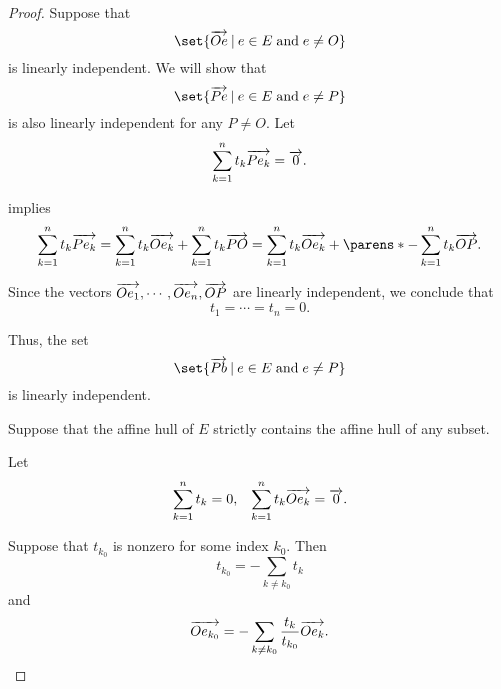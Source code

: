 \begin{proof}
   Suppose that
  \begin{equation*}
    \set{ \vect{O e} \given e \in E \T{and} e \neq O }
  \end{equation*}
  is linearly independent. We will show that
  \begin{equation*}
    \set{ \vect{P e} \given e \in E \T{and} e \neq P }
  \end{equation*}
  is also linearly independent for any \( P \neq O \). Let
  \begin{equation*}
    \sum_{k=1}^n t_k \overrightarrow{P e_k} = \overrightarrow{0}.
  \end{equation*}

   implies
  \begin{equation*}
    \sum_{k=1}^n t_k \vect{P e_k}
    =
    \sum_{k=1}^n t_k \vect{O e_k} + \sum_{k=1}^n t_k \vect{P O}
    =
    \sum_{k=1}^n t_k \vect{O e_k} + \parens*{ -\sum_{k=1}^n t_k } \vect{O P}.
  \end{equation*}

  Since the vectors \( \overrightarrow{O e_1}, \cdots, \overrightarrow{O e_n}, \overrightarrow{O P} \) are linearly independent, we conclude that
  \begin{equation*}
    t_1 = \cdots = t_n = 0.
  \end{equation*}

  Thus, the set
  \begin{equation*}
    \set{ \vect{P b} \given e \in E \T{and} e \neq P }
  \end{equation*}
  is linearly independent.

   Suppose that the affine hull of \( E \) strictly contains the affine hull of any subset.

  Let
  \begin{align*}
    \sum_{k=1}^n t_k = 0,
    &&
    \sum_{k=1}^n t_k \overrightarrow{O e_k} = \overrightarrow{0}.
  \end{align*}

  Suppose that \( t_{k_0} \) is nonzero for some index \( k_0 \). Then
  \begin{equation*}
    t_{k_0} = - \sum_{k \neq k_0} t_k
  \end{equation*}
  and
  \begin{equation*}
    \overrightarrow{O e_{k_0}} = -\sum_{k \neq k_0} \frac {t_k} {t_{k_0}} \overrightarrow{O e_k}.
  \end{equation*}


\end{proof}
